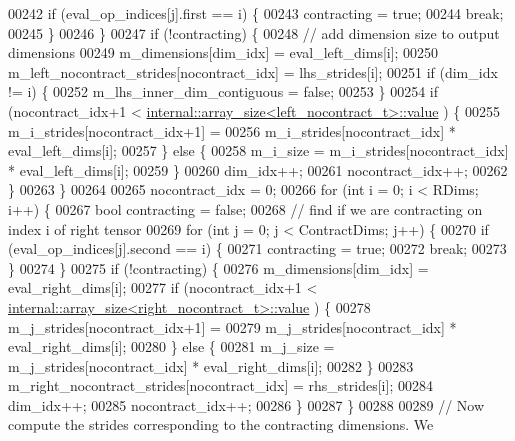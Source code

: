 \begin{DoxyCode}
00242         \textcolor{keywordflow}{if} (eval\_op\_indices[j].first == i) \{
00243           contracting = \textcolor{keyword}{true};
00244           \textcolor{keywordflow}{break};
00245         \}
00246       \}
00247       \textcolor{keywordflow}{if} (!contracting) \{
00248         \textcolor{comment}{// add dimension size to output dimensions}
00249         m\_dimensions[dim\_idx] = eval\_left\_dims[i];
00250         m\_left\_nocontract\_strides[nocontract\_idx] = lhs\_strides[i];
00251         \textcolor{keywordflow}{if} (dim\_idx != i) \{
00252           m\_lhs\_inner\_dim\_contiguous = \textcolor{keyword}{false};
00253         \}
00254         \textcolor{keywordflow}{if} (nocontract\_idx+1 < \hyperlink{struct_eigen_1_1internal_1_1array__size}{internal::array\_size<left\_nocontract\_t>::value}
      ) \{
00255           m\_i\_strides[nocontract\_idx+1] =
00256               m\_i\_strides[nocontract\_idx] * eval\_left\_dims[i];
00257         \} \textcolor{keywordflow}{else} \{
00258           m\_i\_size = m\_i\_strides[nocontract\_idx] * eval\_left\_dims[i];
00259         \}
00260         dim\_idx++;
00261         nocontract\_idx++;
00262       \}
00263     \}
00264 
00265     nocontract\_idx = 0;
00266     \textcolor{keywordflow}{for} (\textcolor{keywordtype}{int} i = 0; i < RDims; i++) \{
00267       \textcolor{keywordtype}{bool} contracting = \textcolor{keyword}{false};
00268       \textcolor{comment}{// find if we are contracting on index i of right tensor}
00269       \textcolor{keywordflow}{for} (\textcolor{keywordtype}{int} j = 0; j < ContractDims; j++) \{
00270         \textcolor{keywordflow}{if} (eval\_op\_indices[j].second == i) \{
00271           contracting = \textcolor{keyword}{true};
00272           \textcolor{keywordflow}{break};
00273         \}
00274       \}
00275       \textcolor{keywordflow}{if} (!contracting) \{
00276         m\_dimensions[dim\_idx] = eval\_right\_dims[i];
00277         \textcolor{keywordflow}{if} (nocontract\_idx+1 < \hyperlink{struct_eigen_1_1internal_1_1array__size}{internal::array\_size<right\_nocontract\_t>::value}
      ) \{
00278           m\_j\_strides[nocontract\_idx+1] =
00279               m\_j\_strides[nocontract\_idx] * eval\_right\_dims[i];
00280         \} \textcolor{keywordflow}{else} \{
00281           m\_j\_size = m\_j\_strides[nocontract\_idx] * eval\_right\_dims[i];
00282         \}
00283         m\_right\_nocontract\_strides[nocontract\_idx] = rhs\_strides[i];
00284         dim\_idx++;
00285         nocontract\_idx++;
00286       \}
00287     \}
00288 
00289     \textcolor{comment}{// Now compute the strides corresponding to the contracting dimensions. We}

\end{DoxyCode}
